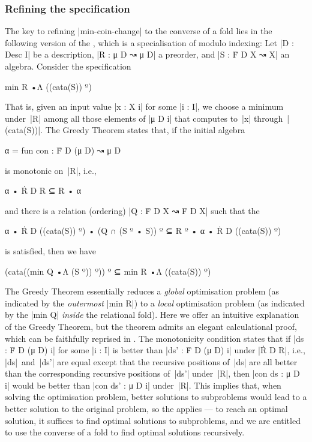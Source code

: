 \subsubsection{Refining the specification}

The key to refining |min-coin-change| to the converse of a fold lies in the following version of the , which is a specialisation of  modulo indexing:
Let |D : Desc I| be a description, |R : μ D ↝ μ D| a preorder, and |S : Ḟ D X ↝ X| an algebra.
Consider the specification
\begin{code}
min R •Λ ((cata(S)) º)
\end{code}
That is, given an input value |x : X i| for some |i : I|, we choose a minimum under~|R| among all those elements of |μ D i| that computes to~|x| through~|(cata(S))|.
The Greedy Theorem states that, if the initial algebra
\begin{code}
α = fun con : Ḟ D (μ D) ↝ μ D
\end{code}
is monotonic on~|R|, i.e.,
\begin{code}
α • Ṙ D R ⊆ R • α
\end{code}
and there is a relation (ordering) |Q : Ḟ D X ↝ Ḟ D X| such that the 
\begin{code}
α • Ṙ D ((cata(S)) º) • (Q ∩ (S º • S)) º ⊆ R º • α • Ṙ D ((cata(S)) º)
\end{code}
is satisfied, then we have
\begin{code}
(cata((min Q •Λ (S º)) º)) º ⊆ min R •Λ ((cata(S)) º)
\end{code}
The Greedy Theorem essentially reduces a \emph{global} optimisation problem (as indicated by the \emph{outermost} |min R|) to a \emph{local} optimisation problem (as indicated by the |min Q| \emph{inside} the relational fold).
Here we offer an intuitive explanation of the Greedy Theorem, but the theorem admits an elegant calculational proof, which can be faithfully reprised in \Agda.
The monotonicity condition states that if |ds : Ḟ D (μ D) i| for some |i : I| is better than |ds' : Ḟ D (μ D) i| under |Ṙ D R|, i.e., |ds|~and~|ds'| are equal except that the recursive positions of~|ds| are all better than the corresponding recursive positions of~|ds'| under~|R|, then |con ds : μ D i| would be better than |con ds' : μ D i| under~|R|.
This implies that, when solving the optimisation problem, better solutions to subproblems would lead to a better solution to the original problem, so the  applies --- to reach an optimal solution, it suffices to find optimal solutions to subproblems, and we are entitled to use the converse of a fold to find optimal solutions recursively.
